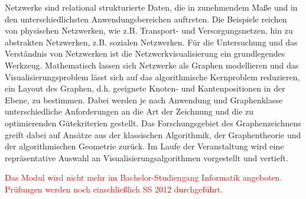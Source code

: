 \begin{module}
\begin{learningoutcomes}
\end{learningoutcomes}

\begin{content}
Netzwerke sind relational strukturierte Daten, die in zunehmendem Maße und in den unterschiedlichsten Anwendungsbereichen auftreten. Die Beispiele reichen von physischen Netzwerken, wie z.B. Transport- und Versorgungsnetzen, hin zu abstrakten Netzwerken, z.B. sozialen Netzwerken. Für die Untersuchung und das Verständnis von Netzwerken ist die Netzwerkvisualisierung ein grundlegendes Werkzeug.\newline
\newline
Mathematisch lassen sich Netzwerke als Graphen modellieren und das Visualisierungsproblem lässt sich auf das algorithmische Kernproblem reduzieren, ein Layout des Graphen, d.h. geeignete Knoten- und Kantenpositionen in der Ebene, zu bestimmen. Dabei werden je nach Anwendung und Graphenklasse unterschiedliche Anforderungen an die Art der Zeichnung und die zu optimierenden Gütekriterien gestellt. Das Forschungsgebiet des Graphenzeichnens greift dabei auf Ansätze aus der klassischen Algorithmik, der Graphentheorie und der algorithmischen Geometrie zurück. \newline
\newline
Im Laufe der Veranstaltung wird eine repräsentative Auswahl an Visualisierungsalgorithmen vorgestellt und vertieft.


\end{content}

\begin{remarks}\textcolor{red}{Das Modul wird nicht mehr im Bachelor-Studiengang Informatik angeboten. Prüfungen werden noch einschließlich SS 2012 durchgeführt.}

\end{remarks}

\end{module}

